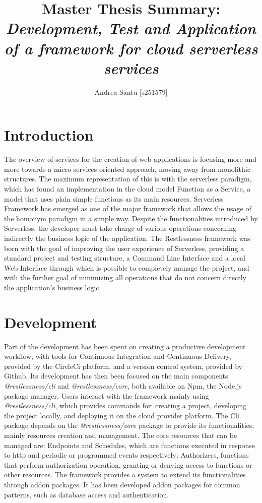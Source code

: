\documentclass{article}
\begin{document}
\title{Master Thesis Summary: \textit{Development, Test and Application of a framework for cloud serverless services}}

\author{Andrea Santu [s251579]}

\maketitle

\section{Introduction}
The overview of services for the creation of web applications is focusing more
and more towards a micro services oriented approach, moving away from monolithic
structures.
The maximum representation of this is with the serverless paradigm, which has
found an implementation in the cloud model Function as a Service, a model that
uses plain simple functions as its main resources.
Serverless Framework has emerged as one of the major framework that allows the
usage of the homonym paradigm in a simple way.
Despite the functionalities introduced by Serverless, the developer must take
charge of various operations concerning indirectly the business logic of the
application.
The Restlessness framework was born with the goal of improving the user experience
of Serverless, providing a standard project and testing structure, a Command Line
Interface and a local Web Interface through which is possible to completely manage
the project, and with the further goal of minimizing all operations that do not
concern directly the application's business logic.

\section{Development}
Part of the development has been spent on creating a productive development
workflow, with tools for Continuous Integration and Continuous Delivery, provided
by the CircleCi platform, and a version control system, provided by Github.
Its development has then been focused on the main components
\mbox{\textit{@restlessness/cli}} and \mbox{\textit{@restlessness/core}}, both
available on Npm, the Node.js package manager.
Users interact with the framework mainly using \mbox{\textit{@restlessness/cli}},
which provides commands for: creating a project, developing the project locally,
and deploying it on the cloud provider platform.
The Cli package depends on the \mbox{\textit{@restlessness/core}} package to provide
its functionalities, mainly resources creation and management. The core resources
that can be managed are: Endpoints and Schedules, which are functions executed in
response to http and periodic or programmed events respectively; Authorizers,
functions that perform authorization operation, granting or denying access to
functions or other resources.
The framework provides a system to extend its functionalities through addon packages.
It has been developed addon packages for common patterns, such as database access
and authentication.
\end{document}
